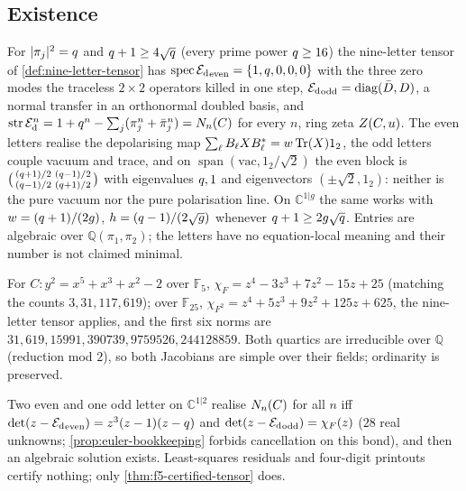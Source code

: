 \subsection{Existence}

\begin{theorem}
\label{thm:nine-letter-tensor}
For $|\pi_j|^2 = q$ and $q+1\ge4\sqrt{q}$ (every prime power $q\ge16$) the nine-letter
tensor of \cref{def:nine-letter-tensor} has $\operatorname{spec}{\mathcal E_{\mathrm d}}_{\mathrm{even}} = \{1,q,0,0,0\}$
with the three zero modes the traceless $2\times2$ operators killed in one step,
${\mathcal E_{\mathrm d}}_{\mathrm{odd}} = \operatorname{diag}(\bar D,D)$, a normal transfer in an orthonormal doubled
basis, and $\operatorname{str}\mathcal E_{\mathrm d}^n = 1+q^n-\sum_j(\pi_j^n+\bar\pi_j^n) = N_{n}(C)$ for every $n$, ring
zeta $Z(C,u)$. The even letters realise the depolarising map $\sum_\ell B_\ell XB_\ell^* = %
w\Tr(X)1_2$, the odd letters couple vacuum and trace, and on $\operatorname{span}(\mathrm{vac},1_2/\sqrt2)$
the even block is $\bigl(\begin{smallmatrix}(q+1)/2&(q-1)/2\\(q-1)/2&(q+1)/2\end{smallmatrix}\bigr)$
with eigenvalues $q,1$ and eigenvectors $(\pm\sqrt2,1_2)$: neither is the pure vacuum nor the
pure polarisation line. On $\mathbb C^{1|g}$ the same works with $w = (q+1)/(2g)$,
$h = (q-1)/(2\sqrt g)$ whenever $q+1\ge2g\sqrt{q}$. Entries are algebraic over
$\mathbb Q(\pi_1,\pi_2)$; the letters have no equation-local meaning and their number is not
claimed minimal.
\end{theorem}

\begin{proposition}
\label{prop:f5-base-change}
For $C\colon y^2 = x^5+x^3+x^2-2$ over $\mathbb F_5$, $\chi_F = z^4-3z^3+7z^2-15z+25$ (matching the
counts $3,31,117,619$); over $\mathbb F_{25}$, $\chi_{F^2} = z^4+5z^3+9z^2+125z+625$, the nine-letter
tensor applies, and the first six norms are $31,619,15991,390739,9759526,244128859$. Both
quartics are irreducible over $\mathbb Q$ (reduction mod $2$), so both Jacobians are simple over
their fields; ordinarity is preserved.
\end{proposition}

\begin{proposition}
\label{prop:three-letter-feasibility}
Two even and one odd letter on $\mathbb C^{1|2}$ realise $N_{n}(C)$ for all $n$ iff
$\det(z-{\mathcal E_{\mathrm d}}_{\mathrm{even}}) = z^3(z-1)(z-q)$ and $\det(z-{\mathcal E_{\mathrm d}}_{\mathrm{odd}}) = \chi_F(z)$
($28$ real unknowns; \cref{prop:euler-bookkeeping} forbids cancellation on this bond), and then
an algebraic solution exists. Least-squares residuals and four-digit printouts certify
nothing; only \cref{thm:f5-certified-tensor} does.
\end{proposition}

